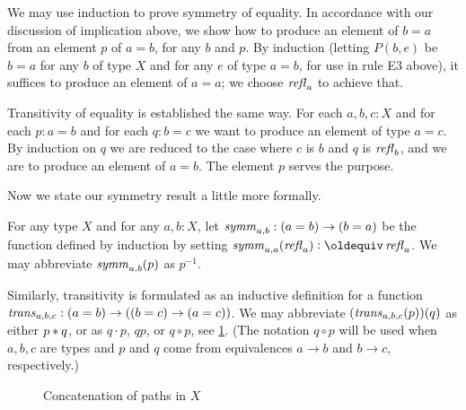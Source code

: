 We may use induction to prove symmetry of equality.  In accordance with our discussion of implication above, we show how to produce an element
of $b=a$ from an element $p$ of $a=b$, for any $b$ and $p$.  By induction (letting $P(b,e)$ be $b=a$ for any $b$ of type $X$ and for any $e$ of
type $a=b$, for use in rule E3 above), it suffices to produce an element of $a=a$; we choose $\mathop{{\it refl}_{a}}$ to achieve that.

Transitivity of equality is established the same way.  For each $a,b,c:X$ and for each $p:a=b$ and for each $q:b=c$ we want to produce an
element of type $a=c$.  By induction on $q$ we are reduced to the case where $c$ is $b$ and $q$ is $\mathop{{\it refl}_{b}}$, and we are to produce an element
of $a=b$.  The element $p$ serves the purpose.  

Now we state our symmetry result a little more formally.

\begin{definition}\label{def:eq-symm}
For any type $X$ and for any $a,b:X$, let $\mathop{\mathit{symm}}_{a,b} : (a=b) \to (b=a)$ 
be the function defined by induction by setting
$\symm_{a,a}(\refl a) \defeq \refl a$.
We may abbreviate $\mathop{\mathit{symm}}_{a,b}(p)$ as $p^{-1}$.
\end{definition}

Similarly, transitivity is formulated as an inductive definition for 
a function $\mathop{\mathit{trans}}_{a,b,c} : (a=b) \to ((b=c) \to (a=c))$.  We may
abbreviate $(\mathop{\mathit{trans}}_{a,b,c}(p))(q)$ as either $p* q$, 
or as $q\cdot p$, $qp$, or $q\circ p$, see \cref{fig:path-concatenation}.
(The notation $q\circ p$ will be used when $a,b,c$ are types and
$p$ and $q$ come from equivalences $a\to b$ and $b\to c$, respectively.)


\begin{figure}
  \centering
  
  \caption{Concatenation of paths in $X$}
  \label{fig:path-concatenation}
\end{figure}

